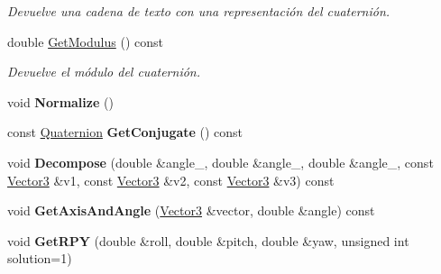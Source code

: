 \begin{DoxyCompactItemize}
\begin{DoxyCompactList}\small\item\em \-Devuelve una cadena de texto con una representación del cuaternión. \end{DoxyCompactList}\item 
double \hyperlink{classdfv_1_1Quaternion_a53cd2807386dfc3d7c30965ba88479cd}{\-Get\-Modulus} () const 
\begin{DoxyCompactList}\small\item\em \-Devuelve el módulo del cuaternión. \end{DoxyCompactList}\item 
\hypertarget{classdfv_1_1Quaternion_ab478a458a056202c520db6035181f35a}{void {\bfseries \-Normalize} ()}\label{classdfv_1_1Quaternion_ab478a458a056202c520db6035181f35a}

\item 
\hypertarget{classdfv_1_1Quaternion_ad73be69491ecc3bdbaf99a60381286ef}{const \hyperlink{classdfv_1_1Quaternion}{\-Quaternion} {\bfseries \-Get\-Conjugate} () const }\label{classdfv_1_1Quaternion_ad73be69491ecc3bdbaf99a60381286ef}

\item 
\hypertarget{classdfv_1_1Quaternion_a87d164e589fe07e388c8d9db61429135}{void {\bfseries \-Decompose} (double \&angle\-\_, double \&angle\-\_, double \&angle\-\_, const \hyperlink{classdfv_1_1Vector3}{\-Vector3} \&v1, const \hyperlink{classdfv_1_1Vector3}{\-Vector3} \&v2, const \hyperlink{classdfv_1_1Vector3}{\-Vector3} \&v3) const }\label{classdfv_1_1Quaternion_a87d164e589fe07e388c8d9db61429135}

\item 
\hypertarget{classdfv_1_1Quaternion_aa6c98b6045a48aaa647ab9e38fd700ec}{void {\bfseries \-Get\-Axis\-And\-Angle} (\hyperlink{classdfv_1_1Vector3}{\-Vector3} \&vector, double \&angle) const }\label{classdfv_1_1Quaternion_aa6c98b6045a48aaa647ab9e38fd700ec}

\item 
\hypertarget{classdfv_1_1Quaternion_a11bdb85deac862cd3b2df553cdcd0bf4}{void {\bfseries \-Get\-R\-P\-Y} (double \&roll, double \&pitch, double \&yaw, unsigned int solution=1)}\label{classdfv_1_1Quaternion_a11bdb85deac862cd3b2df553cdcd0bf4}

\end{DoxyCompactItemize}

